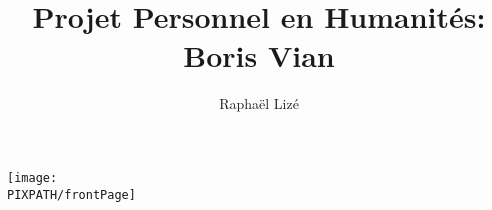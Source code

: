 \documentclass[twoside]{book}
\title{Projet Personnel en Humanités: Boris Vian}
\author{Raphaël Lizé}
\newcommand\PIXPATH{./docs/pics}
\begin{document}



\maketitle

\thispagestyle{empty}

\vfill

\begin{center}
    \texttt{[image: \\PIXPATH/frontPage]}
\end{center}

\pagebreak

\tableofcontents
\vfill
\pagebreak

\end{document}

